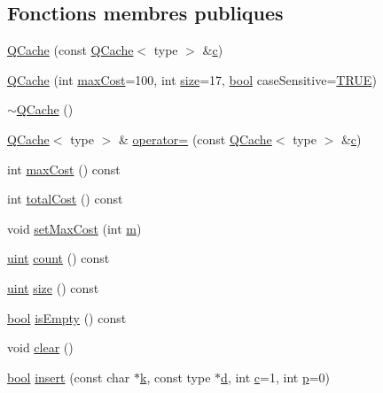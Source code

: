 \subsection*{Fonctions membres publiques}
\begin{DoxyCompactItemize}
\item 
\hyperlink{class_q_cache_ab3a5d53c5d88b1cddd682a6ea2fedf2b}{Q\+Cache} (const \hyperlink{class_q_cache}{Q\+Cache}$<$ type $>$ \&\hyperlink{060__command__switch_8tcl_ab14f56bc3bd7680490ece4ad7815465f}{c})
\item 
\hyperlink{class_q_cache_a8a7ceeb5474b33dd556cef1285f29aa0}{Q\+Cache} (int \hyperlink{class_q_cache_a18c72b2fadb781cff1a9117a409c0569}{max\+Cost}=100, int \hyperlink{class_q_cache_a67a28e589ec2a440635e71a12068f1f7}{size}=17, \hyperlink{qglobal_8h_a1062901a7428fdd9c7f180f5e01ea056}{bool} case\+Sensitive=\hyperlink{qglobal_8h_a04a6422a52070f0dc478693da640242b}{T\+R\+U\+E})
\item 
\hyperlink{class_q_cache_a4ea7f82c8cbc8abab547dd4a0b63a72c}{$\sim$\+Q\+Cache} ()
\item 
\hyperlink{class_q_cache}{Q\+Cache}$<$ type $>$ \& \hyperlink{class_q_cache_ad56788e456b255a08879298d9aeb1cc9}{operator=} (const \hyperlink{class_q_cache}{Q\+Cache}$<$ type $>$ \&\hyperlink{060__command__switch_8tcl_ab14f56bc3bd7680490ece4ad7815465f}{c})
\item 
int \hyperlink{class_q_cache_a18c72b2fadb781cff1a9117a409c0569}{max\+Cost} () const 
\item 
int \hyperlink{class_q_cache_ab44480c72e861325dcc3b08cd614987e}{total\+Cost} () const 
\item 
void \hyperlink{class_q_cache_afd3387a0f863004c27006015b1e9d71d}{set\+Max\+Cost} (int \hyperlink{060__command__switch_8tcl_a78d127e8bda64d4471ac811ad512fbd9}{m})
\item 
\hyperlink{qglobal_8h_a4d3943ddea65db7163a58e6c7e8df95a}{uint} \hyperlink{class_q_cache_a9767ca63042d879082d53f3e983bd4a6}{count} () const 
\item 
\hyperlink{qglobal_8h_a4d3943ddea65db7163a58e6c7e8df95a}{uint} \hyperlink{class_q_cache_a67a28e589ec2a440635e71a12068f1f7}{size} () const 
\item 
\hyperlink{qglobal_8h_a1062901a7428fdd9c7f180f5e01ea056}{bool} \hyperlink{class_q_cache_ae5df7dcab97c20794923a9c746814654}{is\+Empty} () const 
\item 
void \hyperlink{class_q_cache_a23066e089d1e7de0fc1f5ba85bd05719}{clear} ()
\item 
\hyperlink{qglobal_8h_a1062901a7428fdd9c7f180f5e01ea056}{bool} \hyperlink{class_q_cache_a1ac449cbe4630f5c731ecfaf0662db59}{insert} (const char $\ast$\hyperlink{060__command__switch_8tcl_a20363f854eb4098a446733d63d34dbc1}{k}, const type $\ast$\hyperlink{060__command__switch_8tcl_af43f4b1f0064a33b2d662af9f06d3a00}{d}, int \hyperlink{060__command__switch_8tcl_ab14f56bc3bd7680490ece4ad7815465f}{c}=1, int \hyperlink{060__command__switch_8tcl_a15229b450f26d8fa1c10bea4f3279f4d}{p}=0)

\end{DoxyCompactItemize}

